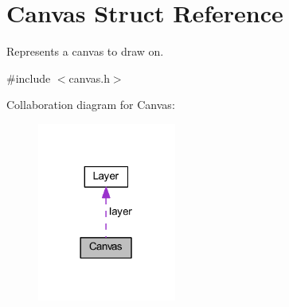 \hypertarget{struct_canvas}{}\section{Canvas Struct Reference}
\label{struct_canvas}


Represents a canvas to draw on.  




{\ttfamily \#include $<$canvas.\+h$>$}



Collaboration diagram for Canvas\+:\nopagebreak
\begin{figure}[H]
\begin{center}
\leavevmode
\includegraphics[width=129pt]{struct_canvas__coll__graph}
\end{center}
\end{figure}
